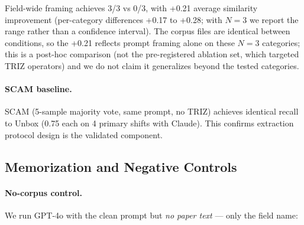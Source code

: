 \documentclass[11pt]{article}
\begin{document}
\begin{table}[t]
\centering
\caption{Prompt ablation (Soft-R@10, 3 primary shifts). Values: best cosine similarity. \emph{Post-hoc, exploratory} ($N{=}3$); descriptive, not confirmatory.}
\label{tab:ablation}
\footnotesize
\setlength{\tabcolsep}{4pt}
\end{table}

Field-wide framing achieves 3/3 vs 0/3, with +0.21 average similarity improvement (per-category differences +0.17 to +0.28; with $N{=}3$ we report the range rather than a confidence interval). The corpus files are identical between conditions, so the +0.21 reflects prompt framing alone on these $N=3$ categories; this is a post-hoc comparison (not the pre-registered ablation set, which targeted TRIZ operators) and we do not claim it generalizes beyond the tested categories.

\paragraph{SCAM baseline.}
SCAM (5-sample majority vote, same prompt, no TRIZ) achieves identical recall to Unbox (0.75 each on 4 primary shifts with Claude). This confirms extraction protocol design is the validated component.

\subsection{Memorization and Negative Controls}\label{sec:memorization}

\paragraph{No-corpus control.}
We run GPT-4o with the clean prompt but \emph{no paper text} --- only the field name:

\begin{table}[t]
\centering
\caption{No-corpus memorization control (GPT-4o, 4 primary shifts).}
\label{tab:nocorpus}
\footnotesize
\setlength{\tabcolsep}{4pt}
\end{table}
\end{document}
